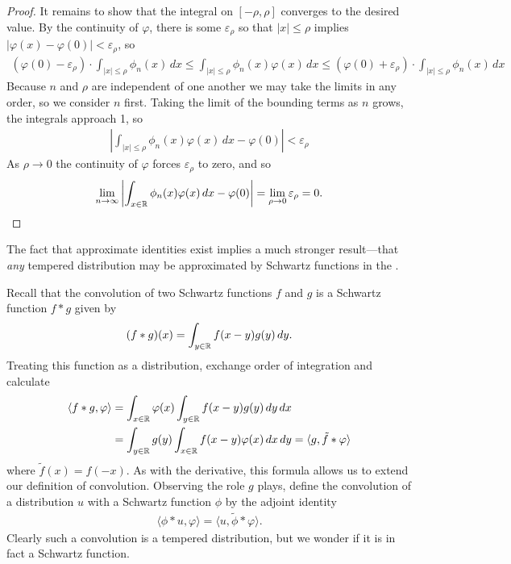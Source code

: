 \begin{proof}
      It remains to show that the integral on $[-\rho,\rho]$ converges to the desired value.
      By the continuity of $\varphi$, there is some $\varepsilon_\rho$ so that $|x|\le\rho$ implies $|\varphi(x)-\varphi(0)|<\varepsilon_\rho$, so
      \begin{align*}
        (\varphi(0)-\varepsilon_\rho)\cdot \int_{|x|\le\rho} \phi_n(x)\,dx
        \le \int_{|x|\le\rho} \phi_n(x)\varphi(x)\,dx
        \le (\varphi(0)+\varepsilon_\rho)\cdot \int_{|x|\le\rho} \phi_n(x)\, dx
      \end{align*}
      Because $n$ and $\rho$ are independent of one another we may take the limits in any order, so we consider $n$ first.
      Taking the limit of the bounding terms as $n$ grows, the integrals approach 1, so
      \begin{align*}
        \left| \int_{|x|\le\rho} \phi_n(x)\varphi(x)\,dx - \varphi(0) \right|
        < \varepsilon_\rho
      \end{align*}
      As $\rho\rightarrow0$ the continuity of $\varphi$ forces $\varepsilon_\rho$ to zero, and so
      \begin{align*}
        \lim_{n\rightarrow\infty} \left| \int_{x\in\mathbb{R}} \phi_n(x)\varphi(x)\,dx - \varphi(0) \right|
        = \lim_{\rho\rightarrow 0} \varepsilon_\rho
        = 0 \text{.}
      \end{align*}
    \end{proof}

    The fact that approximate identities exist implies a much stronger result---that \emph{any} tempered distribution may be approximated by Schwartz functions in the \ws.

    Recall that the convolution of two Schwartz functions $f$ and $g$ is a Schwartz function $f*g$ given by
    \begin{align*}
      (f*g)(x) = \int_{y\in\mathbb{R}} f(x-y)g(y)\,dy \text{.}
    \end{align*}
    Treating this function as a distribution, exchange order of integration and calculate
    \begin{align*}
      \langle f*g,\varphi\rangle
      &= \int_{x\in\mathbb{R}} \varphi(x) \int_{y\in\mathbb{R}} f(x-y)g(y)\,dy\,dx
      \\&= \int_{y\in\mathbb{R}} g(y) \int_{x\in\mathbb{R}} f(x-y)\varphi(x)\,dx\,dy
      = \langle g, \tilde f*\varphi\rangle
    \end{align*}
    where $\tilde f(x) = f(-x)$.
    As with the derivative, this formula allows us to extend our definition of convolution.
    Observing the role $g$ plays, define the convolution of a distribution $u$ with a Schwartz function $\phi$ by the adjoint identity
    \begin{align*}
      \langle \phi*u, \varphi\rangle
      = \langle u, \tilde\phi*\varphi\rangle \text{.}
    \end{align*}
    Clearly such a convolution is a tempered distribution, but we wonder if it is in fact a Schwartz function.
    
